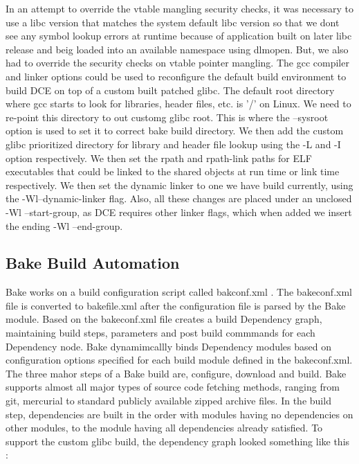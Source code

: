 \documentclass{sig-alternate}
\begin{document}
In an attempt to override the vtable mangling security checks, it was necessary to use a libc version that matches the system default libc version 
so that we dont see any symbol lookup errors at runtime because of application built on later libc release and beig loaded into an available namespace
using dlmopen. But, we also had to override the security checks on vtable pointer mangling. The gcc compiler and linker options could be used to 
reconfigure the default build environment to build DCE on top of a custom built patched glibc. The default root directory where gcc starts to look for
libraries, header files, etc. is  '/' on Linux. We need to re-point this directory to out customg glibc root. This is where the --sysroot option 
is used to set it to correct bake build directory. We then add the custom glibc prioritized directory for library and header file lookup using the 
-L and -I option respectively. We then set the rpath and rpath-link paths for ELF executables that could be linked to the shared objects at run time 
or link time respectively. We then set the dynamic linker to one we have build currently, using the -Wl--dynamic-linker flag. Also, all these changes
are placed under an unclosed -Wl --start-group, as DCE requires other linker flags, which when added we insert the ending -Wl --end-group.



\subsection{Bake Build Automation}

Bake works on a build configuration script called bakconf.xml . The bakeconf.xml file is converted to bakefile.xml after the configuration file is 
parsed by the Bake module. Based on the bakeconf.xml file creates a build Dependency graph, maintaining build steps, parameters and post build 
commmands for each Dependency node. Bake dynamimcallly binds Dependency modules based on configuration options specified for each build module 
defined in the bakeconf.xml. The three mahor steps of a Bake build are, configure, download and build. Bake supports almost all major types of 
source code fetching methods, ranging from git, mercurial to standard publicly available zipped archive files. In the build step, dependencies 
are built in the order with modules having no dependencies on other modules, to the module having all dependencies already satisfied. To support 
the custom glibc build, the dependency graph looked something like this : 
\end{document}
